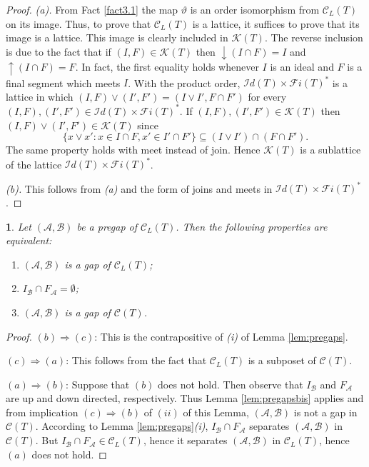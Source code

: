 \documentclass[12pt]{amsart}
\newtheorem{lemma}[definition]{\noindent {\bf Lemma}}
\begin{document}
\begin{proof}
{\it (a).}  From Fact \ref {fact3.1} the map $\vartheta$ is an order
isomorphism from $\mathcal{C}_{ L}(T)$ on its image. Thus, to prove
that $\mathcal{C}_{ L}(T)$ is a lattice, it suffices to prove that its
image is a lattice. This image is clearly included in $\mathcal
K(T)$. The reverse inclusion is due to the fact that if $(I, F)\in
\mathcal K(T)$ then ${\downarrow \!\!}(I \cap F)=I$ and
${\uparrow \!\!}(I\cap F)=F$.  In fact, the first equality holds
whenever $I$ is an ideal and $F$ is a final segment which meets $I$.
With the product order, $\mathcal {I}d(T)\times \mathcal {F}i(T)^*$ is
a lattice in which $(I,F)\vee(I',F')=(I\vee I', F\cap F')$ for every
$(I,F), (I',F')\in \mathcal {I}d(T)\times \mathcal {F}i(T)^*$.  If
$(I,F), (I',F')\in \mathcal K(T)$ then $(I,F)\vee(I',F')\in \mathcal
K(T)$ since $$\{x\vee x': x\in I\cap F, x'\in I'\cap F'\} \subseteq
(I\vee I')\cap (F\cap F').$$ The same property holds with meet instead
of join. Hence $\mathcal K(T)$ is a sublattice of the lattice
$\mathcal {I}d(T)\times \mathcal {F}i(T)^*$.

\noindent
{\it (b).}  This follows from {\it (a)} and the form of joins and
meets in $\mathcal {I}d(T)\times \mathcal {F}i(T)^*$. \end{proof}

\begin{lemma}\label{lem:filling}
Let $(\mathcal A,  \mathcal B)$ be a pregap of $\mathcal{C}_{ L}(T)$. Then the following properties are equivalent:
\begin{enumerate}[{(a)}]
\item $(\mathcal A, \mathcal B)$ is a gap of $\mathcal{C}_{ L}(T)$;
\item  $I_{\mathcal B}\cap F_{\mathcal A} = \emptyset$;
\item  $(\mathcal A, \mathcal B)$ is a gap of $\mathcal{C}(T)$.
\end{enumerate}

\end{lemma}  
\begin{proof} $(b) \Rightarrow (c)$:  This is the contrapositive of  {\it(i)} of Lemma \ref{lem:pregaps}. 

\noindent
$(c) \Rightarrow (a)$: This follows from the fact that $\mathcal{C}_{ L}(T)$ is a subposet of $\mathcal{C}(T)$. 

\noindent
$(a) \Rightarrow (b)$: Suppose that $(b)$ does not hold. Then observe
that $I_{\mathcal B}$ and $F_{\mathcal A}$ are up and down directed,
respectively. Thus Lemma \ref{lem:pregapsbis} applies and from
implication $(c)\Rightarrow (b)$ of $(ii)$ of this Lemma, $(\mathcal
A, \mathcal B)$ is not a gap in $\mathcal{C}(T)$. According to Lemma
\ref{lem:pregaps}{\it (i)}, $I_{\mathcal B}\cap F_{\mathcal A}$
separates $(\mathcal A, \mathcal B)$ in $\mathcal{C}(T)$. But
$I_{\mathcal B}\cap F_{\mathcal A}\in \mathcal{C}_{ L}(T)$, hence it
separates $(\mathcal A, \mathcal B)$ in $\mathcal{C}_{ L}(T)$, hence
$(a)$ does not hold.
\end{proof}
\end{document}
